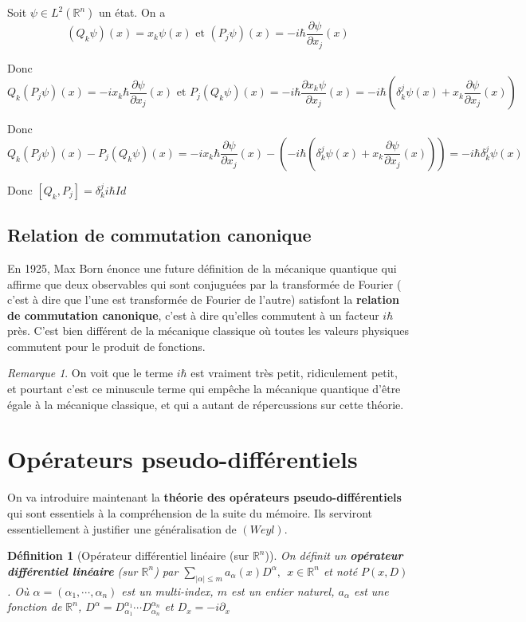 \documentclass[a4paper, 12pt]{report}
\newcommand{\R}{\mathbb{R}} %
\renewcommand{\.}{\cdot} %
\theoremstyle{break}
\newtheorem{definition}{Définition}
\theoremstyle{remark}
\newtheorem{remark}{Remarque}
\theoremstyle{proofstyle}
\begin{document}
Soit $\psi \in L^2(\R^n)$ un état.
On a $$(Q_k \psi)(x) = x_k \psi(x) \text{ et } (P_j \psi)(x) = -i \hbar \frac{ \partial \psi}{\partial x_j}(x)$$

Donc $$Q_k(P_j \psi)(x) = -i x_k \hbar \frac{\partial \psi}{\partial x_j}(x) \text{ et } P_j(Q_k \psi)(x) = -i \hbar \frac{\partial x_k \psi}{\partial x_j}(x) = -i \hbar \left( \delta_k^j\psi(x) + x_k \frac{\partial \psi}{ \partial x_j} (x)\right)$$

Donc $$Q_k(P_j \psi)(x)- P_j(Q_k \psi)(x) = -i x_k \hbar \frac{\partial \psi}{\partial x_j}(x)-\left(-i \hbar \left( \delta_k^j \psi(x) + x_k \frac{\partial \psi}{\partial x_j}(x)\right)\right)=-i \hbar \delta_k^j \psi(x)$$

Donc $[Q_k, P_j] = \delta _k^j i \hbar Id$

\subsection{Relation de commutation canonique}
En 1925, Max Born énonce une future définition de la mécanique quantique qui affirme que deux observables qui sont conjuguées par la transformée de Fourier ( c'est à dire que l'une est transformée de Fourier de l'autre) satisfont la \textbf{relation de commutation canonique}, c'est à dire qu'elles commutent à un facteur $ i \hbar$ près. C'est bien différent de la mécanique classique où toutes les valeurs physiques commutent pour le produit de fonctions.

\begin{remark}
    On voit que le terme $i \hbar$ est vraiment très petit, ridiculement petit, et pourtant c'est ce minuscule terme qui empêche la mécanique quantique d'être égale à la mécanique classique, et qui a autant de répercussions sur cette théorie.
\end{remark}

\vspace{5pt}

\section{Opérateurs pseudo-différentiels}

On va introduire maintenant la \textbf{théorie des opérateurs pseudo-différentiels} qui sont essentiels à la compréhension de la suite du mémoire. Ils serviront essentiellement à justifier une généralisation de $(Weyl)$.

\begin{definition}[Opérateur différentiel linéaire (sur $\mathbb{R}^n$)]
    On définit un \textbf{opérateur différentiel linéaire} (sur $\mathbb{R}^n$) par $\underset{|\alpha| \leq m}{\sum} a_\alpha (x) D^\alpha, ~~ x \in \mathbb{R}^n$ et noté $P(x, D)$.
    Où $\alpha = (\alpha_1, \cdots, \alpha_n)$ est un multi-index, $m$ est un entier naturel, $a_\alpha$ est une fonction de $\R^n$, $D^\alpha = D_{\alpha_1}^{\alpha_1} \cdots D_{\alpha_n}^{\alpha_n}$ et $D_x = -i \partial _x$
\end{definition}
\end{document}

